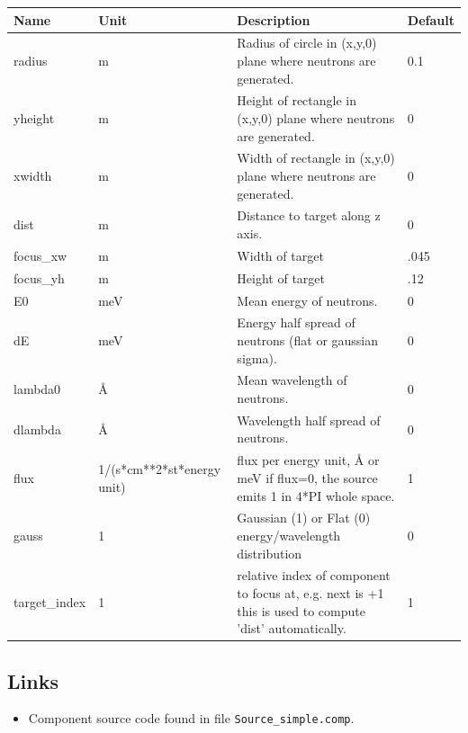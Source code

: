 \begin{longtable}{p{}p{}p{}p{}}
\toprule
\textbf{Name} & \textbf{Unit} & \textbf{Description} & \textbf{Default} \\
\midrule
\endhead
radius & m & Radius of circle in (x,y,0) plane where neutrons are generated. & 0.1 \\
yheight & m & Height of rectangle in (x,y,0) plane where neutrons are generated. & 0 \\
xwidth & m & Width of rectangle in (x,y,0) plane where neutrons are generated. & 0 \\
dist & m & Distance to target along z axis. & 0 \\
focus\_xw & m & Width of target & .045 \\
focus\_yh & m & Height of target & .12 \\
E0 & meV & Mean energy of neutrons. & 0 \\
dE & meV & Energy half spread of neutrons (flat or gaussian sigma). & 0 \\
lambda0 & \AA{} & Mean wavelength of neutrons. & 0 \\
dlambda & \AA{} & Wavelength half spread of neutrons. & 0 \\
flux & 1/(s*cm**2*st*energy unit) & flux per energy unit, \AA{} or meV if flux=0, the source emits 1 in 4*PI whole space. & 1 \\
gauss & 1 & Gaussian (1) or Flat (0) energy/wavelength distribution & 0 \\
target\_index & 1 & relative index of component to focus at, e.g. next is +1 this is used to compute 'dist' automatically. & 1 \\
\bottomrule
\end{longtable}

\subsection*{Links}
\begin{itemize}
  \item Component source code found in file \texttt{Source\_simple.comp}.
\end{itemize}
